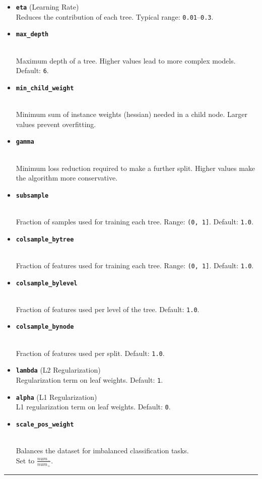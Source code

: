 \documentclass[12pt]{book}
\begin{document}
\begin{itemize}
\item
  \textbf{\texttt{eta}} (Learning Rate)\\
  Reduces the contribution of each tree. Typical range:
  \texttt{0.01}--\texttt{0.3}.
\item
  \textbf{\texttt{max\_depth}}\strut \\
  Maximum depth of a tree. Higher values lead to more complex models.
  Default: \texttt{6}.
\item
  \textbf{\texttt{min\_child\_weight}}\strut \\
  Minimum sum of instance weights (hessian) needed in a child node.
  Larger values prevent overfitting.
\item
  \textbf{\texttt{gamma}}\strut \\
  Minimum loss reduction required to make a further split. Higher values
  make the algorithm more conservative.
\item
  \textbf{\texttt{subsample}}\strut \\
  Fraction of samples used for training each tree. Range:
  \texttt{(0,\ 1{]}}. Default: \texttt{1.0}.
\item
  \textbf{\texttt{colsample\_bytree}}\strut \\
  Fraction of features used for training each tree. Range:
  \texttt{(0,\ 1{]}}. Default: \texttt{1.0}.
\item
  \textbf{\texttt{colsample\_bylevel}}\strut \\
  Fraction of features used per level of the tree. Default:
  \texttt{1.0}.
\item
  \textbf{\texttt{colsample\_bynode}}\strut \\
  Fraction of features used per split. Default: \texttt{1.0}.
\item
  \textbf{\texttt{lambda}} (L2 Regularization)\\
  Regularization term on leaf weights. Default: \texttt{1}.
\item
  \textbf{\texttt{alpha}} (L1 Regularization)\\
  L1 regularization term on leaf weights. Default: \texttt{0}.
\item
  \textbf{\texttt{scale\_pos\_weight}}\strut \\
  Balances the dataset for imbalanced classification tasks. \\ 
  Set to \(\frac{num_{-}}{num_{+}} \).
\end{itemize}

\begin{center}\rule{0.5\linewidth}{0.5pt}\end{center}
\end{document}
